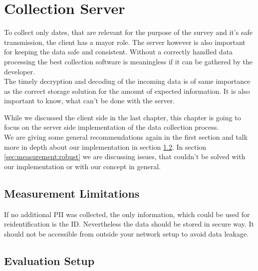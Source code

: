 \chapter{Collection Server}
\label{chap:mmeasurement}
To collect only dates, that are relevant for the purpose of the survey and it's safe transmission, the client has a mayor role. The server however is also important for keeping the data safe and consistent. Without a correctly handled data processing the best collection software is meaningless if it can be gathered by the developer.\\
The timely decryption and decoding of the incoming data is of same importance as the correct storage solution for the amount of expected information. It is also important to know, what can't be done with the server.

While we discussed the client side in the last chapter, this chapter is going to focus on
the server side implementation of the data collection process.\\
We are giving some general recommendations again in the first section and talk more in depth about our implementation in section \ref{sec:measurement:eval_setup}.
In section \ref{sec:measurement:robust} we are discussing issues, that couldn't be solved with our implementation or with our concept in general.
%


\section{Measurement Limitations}
\label{sec:measurement:limits}
%
If no additional PII was collected, the only information, which could be used for reidentification is the ID. 
Nevertheless the data should be stored in secure way. It should not be accessible from outside your network setup to avoid data leakage. 
%

\section{Evaluation Setup}
\label{sec:measurement:eval_setup}
%


%
\newpage
%
 

